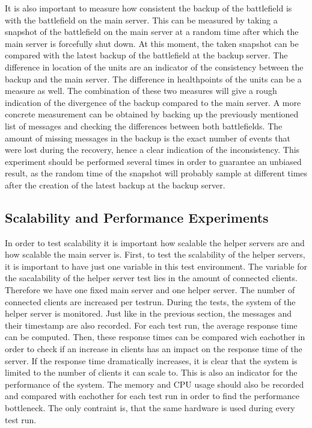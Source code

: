It is also important to measure how consistent the backup of the battlefield is with the battlefield on the main server.
This can be measured by taking a snapshot of the battlefield on the main server at a random time after which the main server is forcefully shut down. 
At this moment, the taken snapshot can be compared with the latest backup of the battlefield at the backup server. 
The difference in location of the units are an indicator of the consistency between the backup and the main server. The difference in healthpoints of the units can be a measure as well. The combination of these two measures will give a rough indication of the divergence of the backup compared to the main server. 
A more concrete measurement can be obtained by backing up the previously mentioned list of messages and checking the differences between both battlefields. The amount of missing messages in the backup is the exact number of events that were lost during the recovery, hence a clear indication of the inconsistency. 
This experiment should be performed several times in order to guarantee an unbiased result, as the random time of the snapshot will probably sample at different times after the creation of the latest backup at the backup server. 

\subsection{Scalability and Performance Experiments}
In order to test scalability it is important how scalable the helper servers are and how scalable the main server is. 
First, to test the scalability of the helper servers, it is important to have just one variable in this test environment. 
The variable for the sacalability of the helper server test lies in the amount of connected clients. 
Therefore we have one fixed main server and one helper server.
The number of connected clients are increased per testrun. 
During the tests, the system of the helper server is monitored.
Just like in the previous section, the messages and their timestamp are also recorded.
For each test run, the average response time can be computed.
Then, these response times can be compared wich eachother in order to check if an increase in clients has an impact on the response time of the server.
If the response time dramatically increases, it is clear that the system is limited to the number of clients it can scale to. 
This is also an indicator for the performance of the system.
The memory and CPU usage should also be recorded  and compared with eachother for each test run in order to find the performance bottleneck. 
The only contraint is, that the same hardware is used during every test run.

